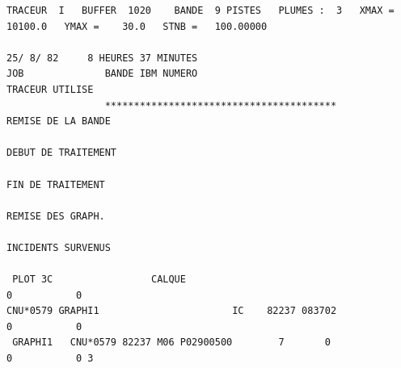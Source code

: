 {\fontsize{4}{5}\selectfont
\begin{verbatim}
TRACEUR  I   BUFFER  1020    BANDE  9 PISTES   PLUMES :  3   XMAX =    10100.0   YMAX =    30.0   STNB =   100.00000
                                                                    25/ 8/ 82     8 HEURES 37 MINUTES
JOB              BANDE IBM NUMERO                                   TRACEUR UTILISE
                 ****************************************           REMISE DE LA BANDE
                                                                    DEBUT DE TRAITEMENT
                                                                    FIN DE TRAITEMENT
                                                                    REMISE DES GRAPH.
                                                                    INCIDENTS SURVENUS

 PLOT 3C                 CALQUE                                              0           0
CNU*0579 GRAPHI1                       IC    82237 083702                    0           0
 GRAPHI1   CNU*0579 82237 M06 P02900500        7       0                     0           0 3
\end{verbatim}
}
